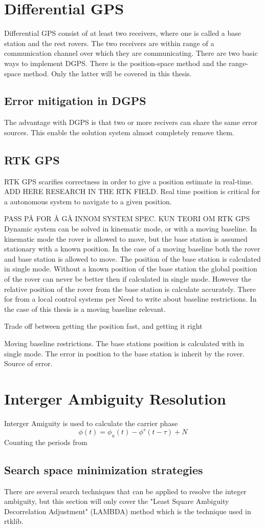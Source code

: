\section{Differential GPS}
Differential GPS consist of at least two receivers, where one is called a base station and the rest rovers. The two receivers are within range of a communication channel over which they are communicating. There are two basic ways to implement DGPS. There is the position-space method and the range-space method. Only the latter will be covered in this thesis.
\subsection{Error mitigation in DGPS}
The advantage with DGPS is that two or more recivers can share the same error sources. This enable the solution system almost completely remove them.


\subsection{RTK GPS}
RTK GPS scarifies correctness in order to give a position estimate in real-time. ADD HERE RESEARCH IN THE RTK FIELD. Real time position is critical for a autonomous system to navigate to a given position. 


PASS PÅ FOR Å GÅ INNOM SYSTEM SPEC. KUN TEORI OM RTK GPS
Dynamic system can be solved in kinematic mode, or with a moving baseline. In kinematic mode the rover is allowed to move, but the base station is assumed stationary with a known position. In the case of a moving baseline both the rover and base station is allowed to move. The position of the base station is calculated in single mode. Without a known position of the base station the global position of the rover can never be better then if calculated in single mode. However the relative position of the rover from the base station is calculate accurately. There for from a local control systems per
Need to write about baseline restrictions. In the case of this thesis is a moving baseline relevant.

Trade off between getting the position fast, and getting it right 

Moving baseline restrictions. The base stations position is calculated with in single mode. The error in position to the base station is inherit by the rover. Source of error.
\section{Interger Ambiguity Resolution}
Interger Amiguity is used to calculate the carrier phase
\begin{equation}
\phi(t) = \phi_u(t)-\phi^s(t-\tau)+N
\end{equation}
Counting the periods from 
\subsection{Search space minimization strategies}
There are several search techniques that can be applied to resolve the integer ambiguity, but this section will only cover the "Least Square Ambiguity Decorrelation Adjustment" (LAMBDA) method which is the technique used in rtklib.


\cleardoublepage